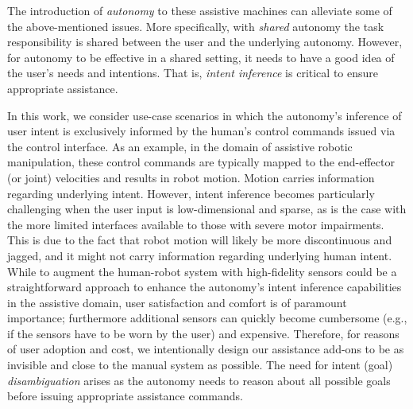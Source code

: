 \documentclass[journal]{IEEEtran}
\begin{document}
The introduction of \textit{autonomy} to these assistive machines can alleviate some of the above-mentioned issues. More specifically, with \textit{shared} autonomy the task responsibility is shared between the user and the underlying autonomy. However, for autonomy to be effective in a shared setting, it needs to have a good idea of the user's needs and intentions. That is, \textit{intent inference} is critical to ensure appropriate assistance. 

In this work, we consider use-case scenarios in which the autonomy's inference of user intent is exclusively informed by the human's control commands issued via the control interface. As an example, in the domain of assistive robotic manipulation, these control commands are typically mapped to the end-effector (or joint) velocities and results in robot motion. Motion carries information regarding underlying intent. However, intent inference becomes particularly challenging when the user input is low-dimensional and sparse, as is the case with the more limited interfaces available to those with severe motor impairments. This is due to the fact that robot motion will likely be more discontinuous and jagged, and it might not carry information regarding underlying human intent. While to augment the human-robot system with high-fidelity sensors could be a straightforward approach to enhance the autonomy's intent inference capabilities in the assistive domain, user satisfaction and comfort is of paramount importance; furthermore additional sensors can quickly become cumbersome (e.g., if the sensors have to be worn by the user) and expensive. Therefore, for reasons of user adoption and cost, we intentionally design our assistance add-ons to be as invisible and close to the manual system as possible. The need for intent (goal) \textit{disambiguation} arises as the autonomy needs to reason about all possible goals before issuing appropriate assistance commands. 

\end{document}
